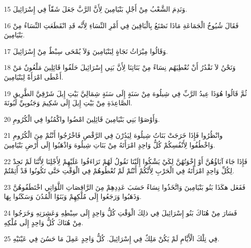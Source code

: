 \par 15 وَنَدِمَ الشَّعْبُ مِنْ أَجْلِ بَنْيَامِينَ لِأَنَّ الرَّبَّ جَعَلَ شَقّاً فِي إِسْرَائِيلَ.
\par 16 فَقَالَ شُيُوخُ الْجَمَاعَةِ مَاذَا نَصْنَعُ بِالْبَاقِينَ فِي أَمْرِ النِّسَاءِ لِأَنَّه قَدِ انْقَطَعَتِ النِّسَاءُ مِنْ بَنْيَامِينَ.
\par 17 وَقَالُوا مِيْرَاثُ نَجَاةٍ لِبَنْيَامِينَ وَلاَ يُمْحَى سِبْطٌ مِنْ إِسْرَائِيلَ.
\par 18 وَنَحْنُ لاَ نَقْدُرُ أَنْ نُعْطِيَهُم نِسَاءً مِنْ بَنَاتِنَا لِأَنَّ بَنِي إِسْرَائِيلَ حَلَفُوا قَائِلِينَ مَلْعُونٌ مَنْ أَعْطَى امْرَأَةً لِبَنْيَامِينَ.
\par 19 ثُمَّ قَالُوا هُوَذَا عِيدُ الرَّبِّ فِي شِيلُوهَ مِنْ سَنَةٍ إِلَى سَنَةٍ شِمَالِيَّ بَيْتِ إِيلَ شَرْقِيَّ الطَّرِيقِ الصَّاعِدَةِ مِنْ بَيْتِ إِيلَ إِلَى شَكِيمَ وَجَنُوبِيِّ لَبُونَةَ.
\par 20 وَأَوْصَوْا بَنِي بَنْيَامِينَ قَائِلِينَ امْضُوا واكْمُنُوا فِي الْكُرُومِ.
\par 21 وانْظُرُوا فَإِذَا خَرَجَتْ بَنَاتُ شِيلُوهَ لِيَدُرْنَ فِي الرَّقْصِ فَاخْرُجُوا أَنْتُمْ مِنَ الْكُرُومِ وَاخْطُفُوا لِأَنْفُسِكُمْ كُلُّ وَاحِدٍ امْرَأَتَهُ مِنْ بَنَاتِ شِيلُوهَ وَاذْهَبُوا إِلَى أَرْضِ بَنْيَامِينَ.
\par 22 فَإِذَا جَاءَ آبَاؤُهُنَّ أَوْ إِخْوَتُهُنَّ لِكَيْ يَشْكُوا إِلَيْنَا نَقُولُ لَهُمْ تَرَاءَفُوا عَلَيْهِمْ لِأَجْلِنَا لِأَنَّنَا لَمْ نَجِدْ لِكُلِّ وَاحِدٍ امْرَأَتَهُ فِي الْحَرْبِ لِأَنَّكُمْ أَنْتُمْ لَمْ تُعْطُوهُمْ فِي الْوَقْتِ حَتَّى تَكُونُوا قَدْ أَثِمْتُمْ.
\par 23 فَفَعَل هكَذَا بَنُو بَنْيَامِينَ وَاتَّخَذُوا نِسَاءً حَسَبَ عَدِدِهِمْ مِنَ الرَّاقِصَاتِ اللَّوَاتِي اخْتَطَفُوهُنَّ وَذَهَبُوا وَرَجَعُوا إِلَى مُلْكِهِمْ وَبَنَوُا الْمُدُنَ وَسَكَنُوا بِهَا.
\par 24 فَسَارَ مِنْ هُنَاكَ بَنُو إِسْرَائِيلَ فِي ذلِكَ الْوَقْتِ كُلُّ وَاحِدٍ إِلَى سِبْطِهِ وَعَشِرَتِهِ وَخَرَجُوا مِنْ هُنَاكَ كُلُّ وَاحِدٍ إِلَى مُلْكِهِ.
\par 25 فِي تِلْكَ الْأَيَّامِ لَمْ يَكُنْ مَلِكٌ فِي إِسْرَائِيلَ. كُلُّ وَاحِدٍ عَمِلَ مَا حَسُنَ فِي عَيْنَيْهِ.


